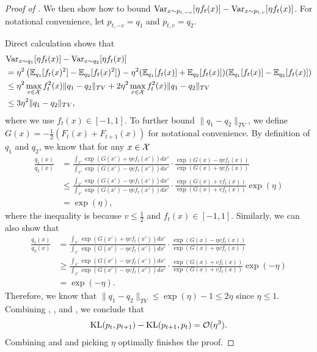 \begin{proof}[Proof of ]
We then show how to bound $\mathrm{Var}_{x\sim p_{t,-v}}[\eta f_t(x)] - \mathrm{Var}_{x\sim p_{t,v}}[\eta f_t(x)]$. For notational convenience, let $p_{t,-v}=q_1$ and $p_{t,v}=q_2$.

Direct calculation shows that
\begin{align}
    &\mathrm{Var}_{x\sim q_1}[\eta f_t(x)] - \mathrm{Var}_{x\sim q_2}[\eta f_t(x)] \nonumber\\
    &=\eta^2\left(\mathbb{E}_{q_1}[f_t(x)^2] - \mathbb{E}_{q_2}[f_t(x)^2]\right) - \eta^2(\mathbb{E}_{q_1}[f_t(x)] + \mathbb{E}_{q_2}[f_t(x)])(\mathbb{E}_{q_1}[f_t(x)] - \mathbb{E}_{q_2}[f_t(x)]) \nonumber\\
    &\leq \eta^2\max_{x\in{\mathcal{X}}}f_t^2(x) \|q_1-q_2\|_{TV} + 2\eta^2\max_{x\in{\mathcal{X}}}f_t^2(x)\|q_1-q_2\|_{TV}\nonumber\\
    &\leq 3\eta^2 \|q_1-q_2\|_{TV}, \label{eqn:KL-3}
\end{align}
where we use $f_t(x)\in[-1,1]$. To further bound $\|q_1-q_2\|_{TV}$, we define $G(x)=-\frac{1}{2}(F_t(x)+F_{t+1}(x))$ for notational convenience. By definition of $q_1$ and $q_2$, we know that for any $x\in{\mathcal{X}}$
\begin{align*}
    \frac{q_1(x)}{q_2(x)} &= \frac{\int_{x'}\exp(G(x')+\eta vf_t(x'))dx'}{\int_{x'}\exp(G(x')-\eta vf_t(x'))dx'} \cdot \frac{\exp(G(x)-\eta vf_t(x))}{\exp(G(x)+\eta vf_t(x))} \\
    &\leq \frac{\int_{x'}\exp(G(x')-\eta vf_t(x'))dx'}{\int_{x'}\exp(G(x')-\eta vf_t(x'))dx'} \cdot \frac{\exp(G(x)+vf_t(x))}{\exp(G(x)+vf_t(x))}\exp(\eta) \\
    &= \exp(\eta),
\end{align*}
where the inequality is because $v\leq \frac{1}{2}$ and $f_t(x)\in[-1,1]$.
Similarly, we can also show that
\begin{align*}
    \frac{q_1(x)}{q_2(x)} &= \frac{\int_{x'}\exp(G(x')+\eta vf_t(x'))dx'}{\int_{x'}\exp(G(x')-\eta vf_t(x'))dx'} \cdot \frac{\exp(G(x)-\eta vf_t(x))}{\exp(G(x)+\eta vf_t(x))} \\
    &\geq \frac{\int_{x'}\exp(G(x')-\eta vf_t(x'))dx'}{\int_{x'}\exp(G(x')-\eta vf_t(x'))dx'} \cdot \frac{\exp(G(x)+vf_t(x))}{\exp(G(x)+vf_t(x))}\exp(-\eta) \\
    &= \exp(-\eta).
\end{align*}
Therefore, we know that $\|q_1-q_2\|_{TV}\leq \exp(\eta) - 1\leq 2\eta $ since $\eta\leq 1$. Combining , , and , we conclude that
\begin{align}\label{eqn:KL-diff-cont}
    \text{\rm KL}(p_t,p_{t+1}) - \text{\rm KL}(p_{t+1},p_{t}) = \mathcal{O}(\eta^3). 
\end{align}
Combining  and  and picking $\eta$ optimally finishes the proof.

\end{proof}
